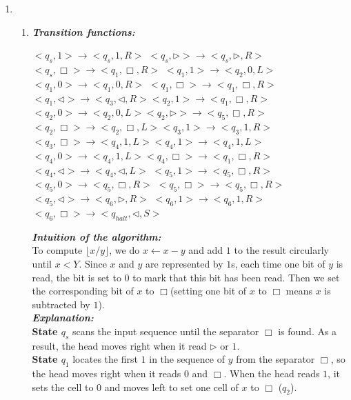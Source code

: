 \documentclass[12pt,a4paper]{article}
\makeatletter
\newtheorem*{solution}{Solution}
\theoremstyle{definition}
\renewenvironment{solution}[1][Solution] {\par\pushQED{\qed}\normalfont\topsep6\p@\@plus6\p@\relax\trivlist\item[\hskip\labelsep\bfseries#1\@addpunct{.}]\ignorespaces}{\popQED\endtrivlist\@endpefalse} \makeatother
\makeatother
\begin{document}
\begin{enumerate}
	\begin{solution}
	~\\
	\begin{enumerate}
	\item \textbf{\textit{Transition functions:}}
	\begin{center}
		$<q_s,1>\rightarrow <q_s,1,R>$ \quad $<q_s,\triangleright >\rightarrow <q_s,\triangleright ,R>$\\
		$<q_s,\Box >\rightarrow <q_1,\Box ,R>$\quad
		 $<q_1,1>\rightarrow <q_2,0,L>$\\ $<q_1,0>\rightarrow <q_1,0,R>$\quad
		 $<q_1,\Box >\rightarrow <q_1,\Box ,R>$\\ $<q_1,\triangleleft >\rightarrow <q_3,\triangleleft,R>$\quad $<q_2,1>\rightarrow <q_1,\Box ,R>$\\
		 $<q_2,0>\rightarrow <q_2,0,L>$\quad $<q_2,\triangleright >\rightarrow <q_5,\Box ,R>$\\
		 $<q_2,\Box >\rightarrow <q_2,\Box ,L>$\quad $<q_3,1>\rightarrow <q_3,1,R>$\\
		 $<q_3,\Box>\rightarrow <q_4,1,L>$\quad $<q_4,1>\rightarrow <q_4,1,L>$\\
		 $<q_4,0>\rightarrow <q_4,1,L>$\quad $<q_4,\Box>\rightarrow <q_1,\Box ,R>$\\
		 $<q_4,\triangleleft >\rightarrow <q_4,\triangleleft,L>$\quad
		 $<q_5,1>\rightarrow <q_5,\Box ,R>$\\ $<q_5,0>\rightarrow <q_5,\Box ,R>$\quad
		 $<q_5,\Box >\rightarrow <q_5,\Box ,R>$\\ $<q_5,\triangleleft>\rightarrow <q_6,\triangleright,R>$\quad
		 $<q_6,1>\rightarrow <q_6,1,R>$ \\ $<q_6,\Box>\rightarrow <q_{halt},\triangleleft,S>$
	\end{center}
	\textbf{\textit{Intuition of the algorithm:}}
	\\
	To compute $\lfloor x/y \rfloor$, we do $x\leftarrow x-y$ and add $1$ to the result circularly until $x<Y$. Since $x$ and $y$ are represented by $1$s, each time one bit of $y$ is read, the bit is set to $0$ to mark that this bit has been read. Then we set the corresponding bit of $x$ to $\Box$(setting one bit of $x$ to $\Box$ means $x$ is subtracted by $1$).
	\\
	\textbf{\textit{Explanation:}}
	\\
	\textbf{State $q_s$} scans the input sequence until the separator $\Box$ is found. As a result, the head moves right when it read $\triangleright$ or $1$.
	\\
	\textbf{State $q_1$} locates the first $1$ in the sequence of $y$ from the separator $\Box$, so the head moves right when it reads $0$ and $\Box$. When the head reads $1$, it sets the cell to $0$ and moves left to set one cell of $x$ to $\Box$ ($q_2$).

\end{enumerate}
\end{solution}
\end{enumerate}
\end{document}
